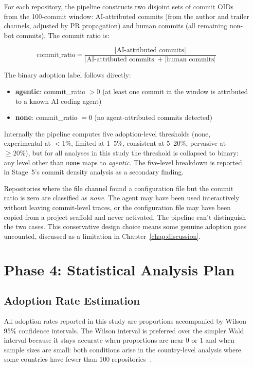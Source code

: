 For each repository, the pipeline constructs two disjoint sets of commit OIDs from the 100-commit window: AI-attributed commits (from the author and trailer channels, adjusted by PR propagation) and human commits (all remaining non-bot commits). The commit ratio is:

\[
\text{commit\_ratio} = \frac{|\text{AI-attributed commits}|}{|\text{AI-attributed commits}| + |\text{human commits}|}
\]

The binary adoption label follows directly:

\begin{itemize}
  \item \textbf{agentic}: commit\_ratio $> 0$ (at least one commit in the window is attributed to a known AI coding agent)
  \item \textbf{none}: commit\_ratio $= 0$ (no agent-attributed commits detected)
\end{itemize}

Internally the pipeline computes five adoption-level thresholds (none, experimental at $<1\%$, limited at 1--5\%, consistent at 5--20\%, pervasive at $\geq 20\%$), but for all analyses in this study the threshold is collapsed to binary: any level other than \texttt{none} maps to \textit{agentic}. The five-level breakdown is reported in Stage~5's commit density analysis as a secondary finding.

Repositories where the file channel found a configuration file but the commit ratio is zero are classified as \textit{none}. The agent may have been used interactively without leaving commit-level traces, or the configuration file may have been copied from a project scaffold and never activated. The pipeline can't distinguish the two cases. This conservative design choice means some genuine adoption goes uncounted, discussed as a limitation in Chapter~\ref{chap:discussion}.

\section{Phase 4: Statistical Analysis Plan}
\label{sec:meth:statistics}

\subsection{Adoption Rate Estimation}

All adoption rates reported in this study are proportions accompanied by Wilson 95\% confidence intervals. The Wilson interval is preferred over the simpler Wald interval because it stays accurate when proportions are near 0 or 1 and when sample sizes are small: both conditions arise in the country-level analysis where some countries have fewer than 100 repositories~\cite{barke2023}.

